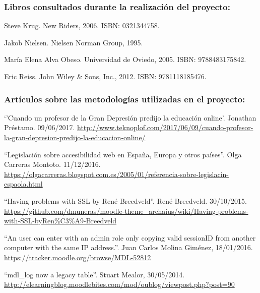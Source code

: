 
\subsubsection*{Libros consultados durante la realización del proyecto:}


Steve Krug.
\newblock New Riders, 2006.
\newblock ISBN: 0321344758.

Jakob Nielsen.
\newblock Nielsen Norman Group, 1995.

María Elena Alva Obeso.
\newblock Universidad de Oviedo, 2005.
\newblock ISBN: 9788483175842.

Eric Reiss.
\newblock John Wiley \& Sons, Inc., 2012.
\newblock ISBN: 9781118185476.


\subsubsection*{Artículos sobre las metodologías utilizadas en el proyecto:}

 `'Cuando un profesor de la Gran Depresión predijo la educación online'. Jonathan Préstamo. 09/06/2017. \url{http://www.teknoplof.com/2017/06/09/cuando-profesor-la-gran-depresion-predijo-la-educacion-online/}

 ``Legislación sobre accesibilidad web en España, Europa y otros países''. Olga Carreras Montoto. 11/12/2016. \url{https://olgacarreras.blogspot.com.es/2005/01/referencia-sobre-legislacin-espaola.html}

 ``Having problems with SSL by René Breedveld''. René Breedveld. 30/10/2015. \url{https://github.com/dmuneras/moodle-theme_archaius/wiki/Having-problems-with-SSL-byRen\%C3\%A9-Breedveld}

 ``An user can enter with an admin role only copying valid sessionID from another computer with the same IP address.''. Juan Carlos Molina Giménez, 18/01/2016. \url{https://tracker.moodle.org/browse/MDL-52812}

 ``mdl\_log now a legacy table''. Stuart Mealor, 30/05/2014. \url{http://elearningblog.moodlebites.com/mod/oublog/viewpost.php?post=90}

